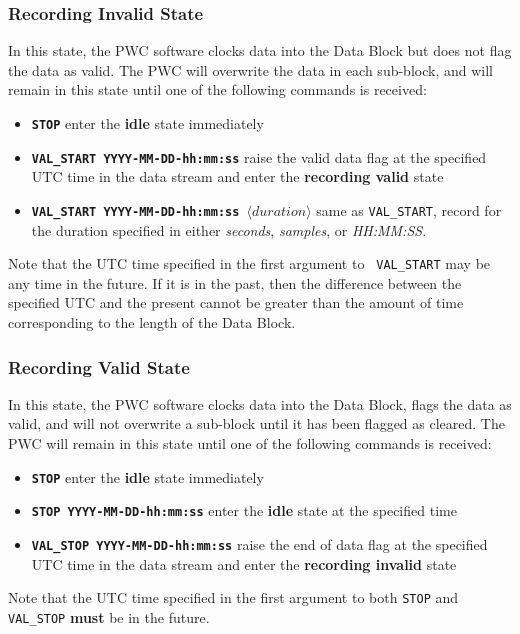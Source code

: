 \subsubsection{Recording Invalid State}

In this state, the PWC software clocks data into the Data Block but
does not flag the data as valid.  The PWC will overwrite the data in
each sub-block, and will remain in this state until one of the
following commands is received:
\begin{itemize}
\item {\tt\bf STOP} enter the {\bf idle} state immediately
\item {\tt\bf VAL\_START YYYY-MM-DD-hh:mm:ss} raise the valid data flag
	at the specified UTC time in the data stream and enter the {\bf
	recording valid} state
\item {\tt\bf VAL\_START YYYY-MM-DD-hh:mm:ss $\langle duration\rangle$} same 
	as {\tt VAL\_START}, record for the duration specified in either
	{\it seconds}, {\it samples}, or {\it HH:MM:SS}.
\end{itemize}
Note that the UTC time specified in the first argument to {\tt
VAL\_START} may be any time in the future.  If it is in the past, then
the difference between the specified UTC and the present cannot be
greater than the amount of time corresponding to the length of the
Data Block.

\subsubsection{Recording Valid State}

In this state, the PWC software clocks data into the Data Block, flags
the data as valid, and will not overwrite a sub-block until it has
been flagged as cleared.  The PWC will remain in this state until one
of the following commands is received:

\begin{itemize}
\item {\tt\bf STOP} enter the {\bf idle} state immediately
\item {\tt\bf STOP YYYY-MM-DD-hh:mm:ss} enter the {\bf idle} state
	at the specified time
\item {\tt\bf VAL\_STOP YYYY-MM-DD-hh:mm:ss} raise the end of data flag
	at the specified UTC time in the data stream and enter the {\bf
	recording invalid} state
\end{itemize}

Note that the UTC time specified in the first argument to both {\tt STOP}
and {\tt VAL\_STOP} {\bf must} be in the future.


